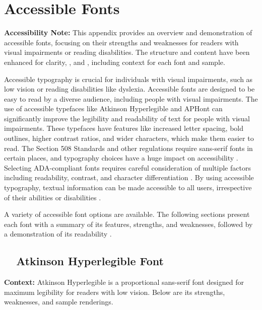 \chapter{Accessible Fonts}\label{app5:appx66}
\begin{raggedright}
	\textbf{Accessibility Note:} This appendix provides an overview and demonstration of accessible fonts, focusing on their strengths and weaknesses for readers with visual impairments or reading disabilities. The structure and content have been enhanced for clarity, , and , including context for each font and sample.

	Accessible typography is crucial for individuals with visual impairments, such as low vision or reading disabilities like dyslexia. Accessible fonts are designed to be easy to read by a diverse audience, including people with visual impairments. The use of accessible typefaces like Atkinson Hyperlegible and APHont can significantly improve the legibility and readability of text for people with visual impairments. These typefaces have features like increased letter spacing, bold outlines, higher contrast ratios, and wider characters, which make them easier to read. The Section 508 Standards \supercite{Section508} and other regulations require sans-serif fonts in certain places, and typography choices have a huge impact on accessibility \supercite{AccessiBe}. Selecting ADA-compliant fonts requires careful consideration of multiple factors including readability, contrast, and character differentiation \supercite{AccessiBeFonts}. By using accessible typography, textual information can be made accessible to all users, irrespective of their abilities or disabilities \supercite{ReadabilityGroup, HubSpot}.

	A variety of accessible font options are available. The following sections present each font with a summary of its  features, strengths, and weaknesses, followed by a demonstration of its readability \supercite{EmptyBoxNote}.
\end{raggedright}


\section{~~Atkinson Hyperlegible Font}\label{app5:sec:atkinson-hyperlegible}
\noindent
\textbf{Context:} Atkinson Hyperlegible is a proportional sans-serif font designed for maximum legibility for readers with low vision. Below are its strengths, weaknesses, and sample renderings.

